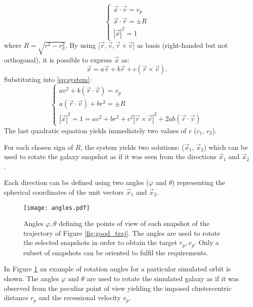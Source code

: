 \begin{equation}
\label{eq:system}
\begin{cases}
\vec x \cdot \vec v = v_p\\
\vec x \cdot \vec r = \pm R\\
|\vec x|^2 = 1
\end{cases}
\end{equation}
where $R = \sqrt{r^2 -r_p^2}$. By using [$\vec r, \vec v, \vec r \times \vec v$] as basis (right-handed but not orthogonal), it is possible to express $\vec x$ as:
\begin{equation}
    \vec x = a \vec v + b \vec r + c ( \vec r \times \vec v).
\end{equation}
Substituting into \eqref{eq:system}:
\begin{equation}
\begin{cases}
a v^2 + b (\vec r \cdot \vec v) = v_p\\
a(\vec r \cdot \vec v) + b r^2 = \pm R\\
|\vec x|^2 = 1 = a v^2 + b r^2 + c^2 | \vec r \times \vec v|^2 + 2 ab(\vec r \cdot \vec v)
\end{cases}
\end{equation}
The last quadratic equation yields immediately two values of $c$ ($c_1$, $c_2$).

For each chosen sign of $R$, the system yields two solutions: ($\vec x_1$, $\vec x_2$) which can be used to rotate the galaxy snapshot as if it was seen from the directions $\vec x_1$ and  $\vec x_2$.

Each direction can be defined using two angles ($\varphi$ and $\theta$) representing the spherical coordinates of the unit vectors $\vec x_1$ and $\vec x_2$.

\begin{figure}
  \centering
  \texttt{[image: angles.pdf]}
  \caption{Angles $\varphi, \theta$ defining the points of view of each snapshot of the trajectory of Figure \ref{fig:good_traj}. The angles are used to rotate the selected snapshots in order to obtain the target $r_p, v_p$. Only a subset of snapshots can be oriented to fulfil the requirements.}
  \label{fig:phitheta}
\end{figure}
In Figure \ref{fig:phitheta} an example of rotation angles for a particular simulated orbit is shown.
The angles $\varphi$ and $\theta$ are used to rotate the simulated galaxy as if it was observed from the peculiar point of view yielding the imposed clustercentric distance $r_p$ and the recessional velocity $v_p$.


